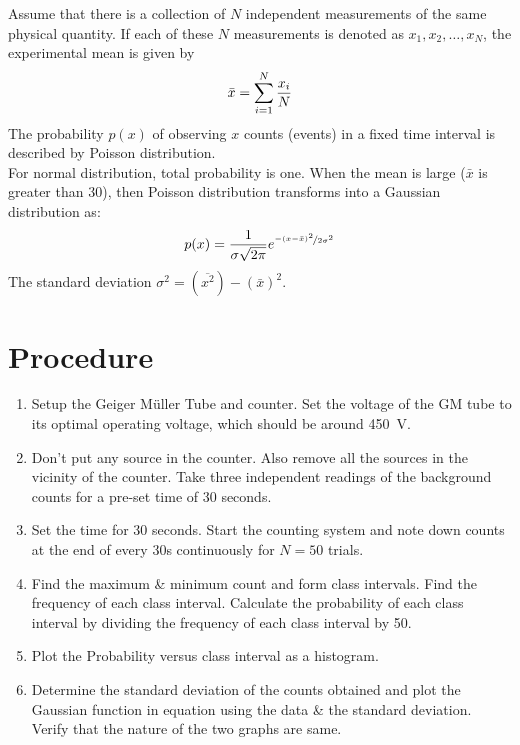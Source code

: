 	Assume that there is a collection of $ N $ independent measurements of the same physical quantity. If each of these $ N $ measurements is denoted
	as $x_{1}, x_{2}, \ldots , x_{N}$, the experimental mean is given by
	\begin{equation}{\label{eqn:1204-mean}}
		\bar{x}=\sum\limits_{i=1}^{N}\dfrac{x_i}{N}
	\end{equation}
	The probability $p(x)$ of observing $x$ counts (events) in a fixed time interval is described by Poisson distribution.\\
	For normal distribution, total probability is one. When the mean is large ($\bar{x}$ is greater than 30), then Poisson distribution transforms into a Gaussian distribution as:
	\begin{equation}{\label{eqn:stdev}}
		p(x)=\dfrac{1}{\sigma\sqrt{2 \pi}} e^{\nicefrac{-(x-\bar{x})^2}{2 \sigma^2}}
	\end{equation}
	The standard deviation $\sigma^2 = (\overline{x^2}) - (\bar{x})^2$.
\section{Procedure}
	
	\begin{enumerate}
		\item 	 Setup the Geiger M{\"u}ller Tube and counter. Set the voltage of the GM tube to its optimal operating voltage, which should be around \SI{450}{\volt}.
		\item 	  Don't put any source in the counter. Also remove all the sources in the vicinity of the counter. Take three independent readings of the background counts for a pre-set time of 30 seconds.
		\item  Set the time for 30 seconds. Start the counting system and note down counts at the end of every 30s continuously for $N=50$ trials.
		
		\item Find the maximum \& minimum count and form class intervals. Find the frequency of each class interval. Calculate the probability of each class interval by dividing the frequency of each class interval by 50.
		
		\item 	Plot the Probability versus class interval as a histogram.
		
		\item 	Determine the standard deviation of the counts obtained and plot the Gaussian function in equation using the data \& the standard deviation. Verify that the nature of the two graphs are same.
		
	\end{enumerate}

